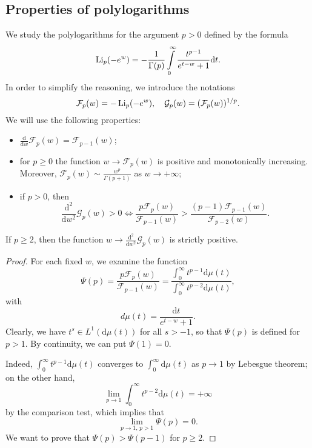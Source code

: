 \begin{subappendices}
\renewcommand{\thesection}{\Alph{section}}
\renewcommand{\thetheorem}{\thesection.\Roman{theorem}}
\setcounter{theorem}{0}
\renewcommand{\thelemma}{\thesection.\arabic{lemma}}
\setcounter{lemma}{0}
\renewcommand{\theproposition}{\thesection.\arabic{proposition}}
\setcounter{proposition}{0}
\section{Properties of polylogarithms}\label{se:appPoly}
We study the polylogarithms for the argument $p>0$ defined by the formula
\begin{equation}\label{eq:defPolyLog}\operatorname{Li}_p(-e^w) = 
-\frac{1}{\Gamma(p)}\int\limits_0^{\infty}\frac{t^{p-1}}{e^{t-w}+1}
\mathrm dt.\end{equation}
In order to simplify the reasoning, we introduce the notations
\begin{equation}\label{eq:defCalF}\mathcal F_p(w)=-\operatorname{Li}_p(-e^w),\quad \mathcal G_p(w)=(\mathcal F_p(w))^{1/p}.\end{equation}
We will use the following properties:
\begin{itemize}
\item $\frac{\mathrm d}{\mathrm dw}\mathcal F_p(w) = \mathcal F_{p-1}(w)$;
\item for $p\ge 0$ the function $w\to \mathcal F_p(w)$ is positive and monotonically increasing. Moreover, $\mathcal F_p(w)\sim \frac{w^{p}}{\Gamma(p+1)}$ as $w\to+\infty$;
\item if $p>0$, then \[ \frac{\mathrm d^2}{\mathrm dw^2}\mathcal G_p(w)>0\iff 
\frac{p\mathcal F_p(w)}{\mathcal F_{p-1}(w)}>\frac{(p-1)\mathcal F_{p-1}(w)}{\mathcal F_{p-2}(w)}.\]
\end{itemize}
\begin{theorem}\label{th:conv}
If $p\ge 2$, then the function $w\to \frac{\mathrm d^2}{\mathrm dw^2}\mathcal G_p(w)$ is strictly positive.
\end{theorem}
\begin{proof}
For each fixed $w$, we examine the function
\[ \Psi(p)= \frac{p\mathcal F_p(w)}{\mathcal 
F_{p-1}(w)}=\frac{\int_0^\infty t^{p-1}\mathrm d\mu(t)}{\int_0^\infty 
t^{p-2}\mathrm d\mu(t)},\]
with 
\[d\mu(t) = \frac{\mathrm dt}{e^{t-w}+1}.\]
Clearly,  we have $t^s\in L^1(\mathrm d\mu(t))$ for all $  s>-1$, so that $\Psi(p)$ is 
defined for $p>1$. By continuity, we can put $\Psi(1)=0$.

Indeed, $\int_0^\infty t^{p-1}\mathrm d\mu(t)$ converges to $\int_0^\infty \mathrm d\mu(t)$ as $p\to 1$ by Lebesgue theorem; on the other hand, \[\lim_{p\to 1}\int_0^\infty t^{p-2}\mathrm d\mu(t)=+\infty\]by the comparison test, which implies that
\[\lim_{p\to 1,\,p>1}\Psi(p)=0.\]
We want to prove 
that $\Psi(p)>\Psi(p-1)$ for $p\ge 2$.


\end{proof}
\end{subappendices}
